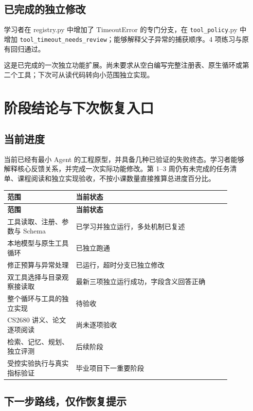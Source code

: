 \subsection{已完成的独立修改}

学习者在 registry.py 中增加了 TimeoutError 的专门分支，在 \nolinkurl{tool_policy}.py 中增加 \nolinkurl{tool_timeout_needs_review}；能够解释父子异常的捕获顺序。4 项练习与原有回归通过。

这是已完成的一次独立功能扩展。尚未要求从空白编写完整注册表、原生循环或第二个工具；下次可从读代码转向小范围独立实现。

\section{阶段结论与下次恢复入口}

\subsection{当前进度}

当前已经有最小 Agent 的工程原型，并具备几种已验证的失败终态。学习者能够解释核心反馈关系，并完成一次实际功能修改。第 1–3 周仍有未完成的任务清单、课程阅读和独立实现验收，不按小课数量直接推算总进度百分比。

{\small\setlength{\tabcolsep}{4pt}
\renewcommand{\arraystretch}{1.25}
\begin{longtable}{>{\raggedright\arraybackslash}p{0.28\linewidth}>{\raggedright\arraybackslash}p{0.63\linewidth}}
\toprule
\textbf{范围} & \textbf{当前状态} \\
\midrule\endfirsthead
\toprule
\textbf{范围} & \textbf{当前状态} \\
\midrule\endhead
\bottomrule\endfoot
工具读取、注册、参数与 Schema & 已学习并独立运行，多处机制已复述 \\
本地模型与原生工具循环 & 已独立跑通 \\
修正预算与异常处理 & 已运行，超时分支已独立修改 \\
双工具选择与目录观察接读取 & 最新三项独立运行成功，字段含义回答正确 \\
整个循环与工具的独立实现 & 待验收 \\
CS2680 讲义、论文逐项阅读 & 尚未逐项验收 \\
检索、记忆、规划、独立评测 & 后续阶段 \\
受控实验执行与真实指标验证 & 毕业项目下一重要阶段 \\
\end{longtable}}

\subsection{下一步路线，仅作恢复提示}

